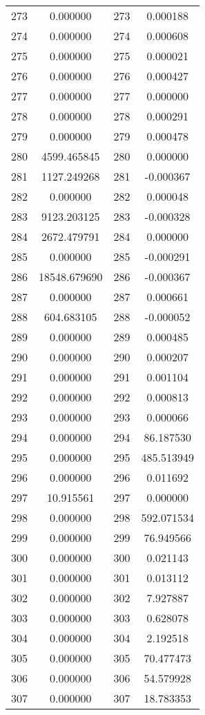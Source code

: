 \documentclass[12pt]{article}
\begin{document}
\begin{longtable}{@{}cccc@{}}
273 & 0.000000 & 273 & 0.000188 \\
274 & 0.000000 & 274 & 0.000608 \\
275 & 0.000000 & 275 & 0.000021 \\
276 & 0.000000 & 276 & 0.000427 \\
277 & 0.000000 & 277 & 0.000000 \\
278 & 0.000000 & 278 & 0.000291 \\
279 & 0.000000 & 279 & 0.000478 \\
280 & 4599.465845 & 280 & 0.000000 \\
281 & 1127.249268 & 281 & -0.000367 \\
282 & 0.000000 & 282 & 0.000048 \\
283 & 9123.203125 & 283 & -0.000328 \\
284 & 2672.479791 & 284 & 0.000000 \\
285 & 0.000000 & 285 & -0.000291 \\
286 & 18548.679690 & 286 & -0.000367 \\
287 & 0.000000 & 287 & 0.000661 \\
288 & 604.683105 & 288 & -0.000052 \\
289 & 0.000000 & 289 & 0.000485 \\
290 & 0.000000 & 290 & 0.000207 \\
291 & 0.000000 & 291 & 0.001104 \\
292 & 0.000000 & 292 & 0.000813 \\
293 & 0.000000 & 293 & 0.000066 \\
294 & 0.000000 & 294 & 86.187530 \\
295 & 0.000000 & 295 & 485.513949 \\
296 & 0.000000 & 296 & 0.011692 \\
297 & 10.915561 & 297 & 0.000000 \\
298 & 0.000000 & 298 & 592.071534 \\
299 & 0.000000 & 299 & 76.949566 \\
300 & 0.000000 & 300 & 0.021143 \\
301 & 0.000000 & 301 & 0.013112 \\
302 & 0.000000 & 302 & 7.927887 \\
303 & 0.000000 & 303 & 0.628078 \\
304 & 0.000000 & 304 & 2.192518 \\
305 & 0.000000 & 305 & 70.477473 \\
306 & 0.000000 & 306 & 54.579928 \\
307 & 0.000000 & 307 & 18.783353 \\

\end{longtable}
\end{document}
